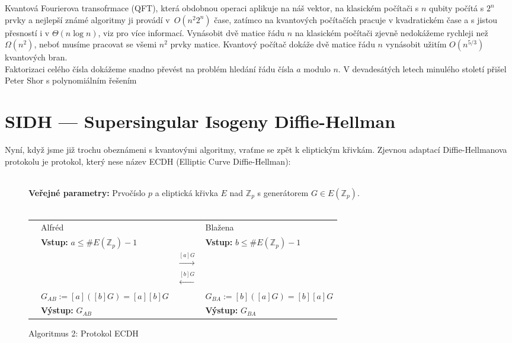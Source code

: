 \documentclass [12pt]{report}
\begin{document}
Kvantová Fourierova transofrmace (QFT), která obdobnou operaci aplikuje na náš vektor, na klasickém počítači s $n$ qubity počítá s $2^n$ prvky a nejlepší známé algoritmy ji provádí v~$O (n^2 2^n)$ čase, zatímco na kvantových počítačích pracuje v kvadratickém čase a s jistou přesností i v $\Theta(n \log n)$, viz \cite[Ch. 4. a 5.]{Chuang} pro více informací. Vynásobit dvě matice řádu $n$ na klasickém počítači zjevně nedokážeme rychleji než $\Omega (n^2)$, neboť musíme pracovat se všemi $n^2$ prvky matice. Kvantový počítač dokáže dvě matice řádu $n$ vynásobit užitím $O(n^{5/3})$ kvantových bran.\\
 
Faktorizaci celého čísla dokážeme snadno převést na problém hledání řádu čísla $a$ modulo $n$. V devadesátých letech minulého století přišel Peter Shor s polynomiálním řešením 

\section{SIDH ---  Supersingular Isogeny Diffie-Hellman}

Nyní, když jsme již trochu obeznámeni s kvantovými algoritmy, vraťme se zpět k eliptickým křivkám. Zjevnou adaptací Diffie-Hellmanova protokolu je protokol, který nese název ECDH (Elliptic Curve Diffie-Hellman):
\begin{figure}[h]
\begin{center} 
\makebox[1cm]{\rule{17.3cm}{0.4pt}}\\
\hspace{-1.35cm} \textbf{Veřejné parametry:} Prvočíslo $p$ a eliptická křivka $E$ nad $\mathbb{Z}_p$ s generátorem $G \in E(\mathbb{Z}_p)$.\\

\vspace{-0.25cm}
\makebox[\linewidth]{\rule{17.3cm}{0.4pt}}\\
\vspace{0.2cm}
\begin{tabular}{l l c l}
\cline{2-2} \cline{4-4} 
& Alfréd & & Blažena \\ 
\cline{2-2} \cline{4-4} 
& \textbf{Vstup:} $a \leqslant \# E(\mathbb{Z}_p)-1$ & & \textbf{Vstup:} $b \leqslant \# E(\mathbb{Z}_p)-1$ \\
 & & $\stackrel{[a]G}{\longrightarrow} $ &  \\
&  & $\stackrel{[b]G}{\longleftarrow} $ &  \\
& $G_{AB} := [a]([b]G) = [a][b]G$ &  & $ G_{BA} := [b]([a]G) = [b][a]G$ \\
& \textbf{Výstup:} $G_{AB}$ & & \textbf{Výstup:} $G_{BA}$
\end{tabular}
\caption*{Algoritmus 2: Protokol ECDH}

\end{center}
\end{figure}
\end{document}
